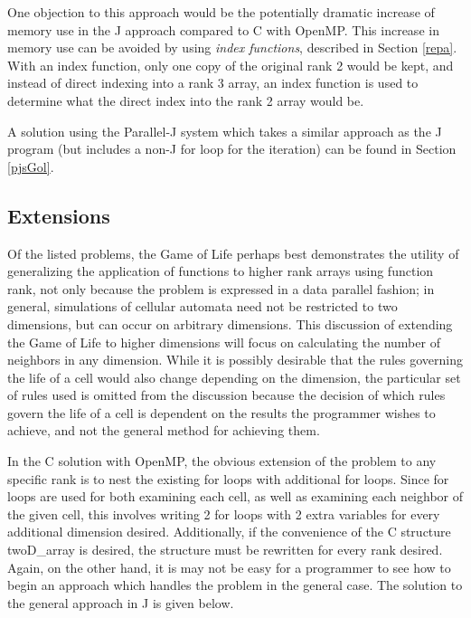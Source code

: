 One objection to this approach would be the potentially dramatic increase 
of memory use in the J approach compared to C with OpenMP. 
This increase in memory use can be avoided by using \textit{index functions}, described in Section \ref{repa}.
With an index function, only one copy of the original rank 2 would be kept, 
and instead of direct indexing into a rank 3 array, 
an index function is used to determine 
what the direct index into the rank 2 array would be.

A solution using the Parallel-J system which takes a similar approach as the J program 
(but includes a non-J for loop for the iteration)
can be found in Section \ref{pjsGol}.

\subsection{Extensions}
Of the listed problems, the Game of Life perhaps best demonstrates the utility 
of generalizing the application of functions to higher rank arrays using function rank, 
not only because the problem is expressed in a data parallel fashion; 
in general, simulations of cellular automata need not be restricted to two dimensions, 
but can occur on arbitrary dimensions.
This discussion of extending the Game of Life to higher dimensions 
will focus on calculating the number of neighbors in any dimension.
While it is possibly desirable that the rules governing the life of a cell 
would also change depending on the dimension, 
the particular set of rules used is omitted from the discussion because 
the decision of which rules govern the life of a cell is 
dependent on the results the programmer wishes to achieve, 
and not the general method for achieving them.

In the C solution with OpenMP, 
the obvious extension of the problem to any specific rank 
is to nest the existing for loops with additional for loops. 
Since for loops are used for both examining each cell, 
as well as examining each neighbor of the given cell, 
this involves writing 2 for loops with 2 extra variables for every additional dimension desired. 
Additionally, if the convenience of the C structure \ttfamily twoD\_array \normalfont is desired, 
the structure must be rewritten for every rank desired. 
Again, on the other hand, it is may not be easy for a programmer to see 
how to begin an approach which handles the problem in the general case.
The solution to the general approach in J is given below.

\begin{singlespacing}
\begin{small}

\end{small}
\end{singlespacing}


